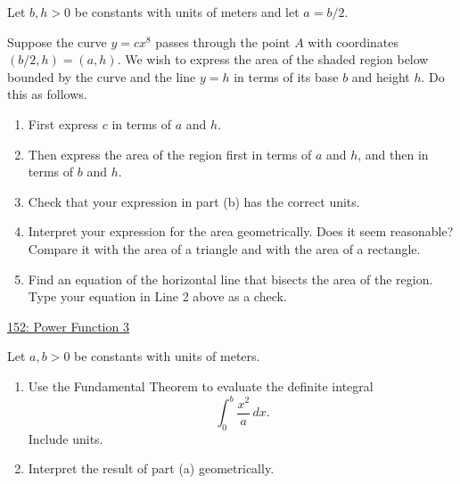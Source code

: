 \documentclass{ximera}
\begin{document}
\begin{question} \label{QOLDefeefKRerbttp}
Let $b,h>0$ be constants with units of meters and let $a=b/2$.

Suppose the curve $y=cx^8$ passes through the point $A$ with coordinates $(b/2,h) = (a,h)$. We wish to express the area of the shaded region below bounded by the curve and the line $y=h$ in terms of its base $b$ and height $h$. Do this as follows.

\begin{enumerate}

\item First express $c$ in terms of $a$ and $h$.

\item Then express the area of the region first in terms of $a$ and $h$, and then in terms of $b$ and $h$.

\item Check that your expression in part (b) has the correct units. 

\item Interpret  your expression for the area geometrically. Does it seem reasonable? Compare it with the area of a triangle and with the area of a rectangle. 

\item Find an equation of the horizontal line that bisects the area of the region. Type your equation in Line 2 above as a check. 

\end{enumerate}

\begin{onlineOnly}
    \begin{center}
\end{center}
\end{onlineOnly}

\href{https://www.desmos.com/calculator/egdpe7cccl}{152: Power Function 3}

\end{question}




\begin{question} \label{QOidfsfer}
Let $a,b>0$ be constants with units of meters.
\begin{enumerate}
\item Use the Fundamental Theorem to evaluate the definite integral
\[
   \int_0^b \frac{x^2}{a}\, dx . 
\]
Include units.

\item Interpret the result of part (a) geometrically.
\end{enumerate}

\end{question}
\end{document}
